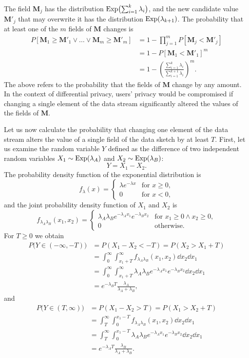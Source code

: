 The field $\mathbf{M}_j$ has the distribution $\operatorname{Exp}\bigl(\sum_{i=1}^{k} \lambda_i\bigr)$, and the new candidate value $\mathbf{M}'_j$ that may overwrite it has the distribution $\operatorname{Exp}(\lambda_{k+1})$. The probability that at least one of the $m$ fields of $\mathbf{M}$ changes is
\begin{align*}
P\left[\mathbf{M}_1 \geq \mathbf{M}'_1 \lor \ldots \lor \mathbf{M}_m \geq \mathbf{M}'_m\right]
  &= 1 - \prod_{j=1}^m P\left[\mathbf{M}_j < \mathbf{M}'_j\right] \\
  &= 1 - P\left[\mathbf{M}_1 < \mathbf{M}'_1\right]^m \\
  &= 1 - \left(\frac{\sum_{i=1}^{k} \lambda_i}{\sum_{i=1}^{k+1} \lambda_i}\right)^m.
\end{align*}
The above refers to the probability that the fields of $\mathbf{M}$ change by any amount. In the context of differential privacy, users' privacy would be compromised if changing a single element of the data stream significantly altered the values of the fields of $\mathbf{M}$.

Let us now calculate the probability that changing one element of the data stream alters the value of a single field of the data sketch by at least $T$. First, let us examine the random variable $Y$ defined as the difference of two independent random variables $X_1 \sim \operatorname{Exp}(\lambda_A)$ and $X_2 \sim \operatorname{Exp}(\lambda_B)$:
\[
Y = X_1 - X_2.
\]
The probability density function of the exponential distribution is
\[
f_\lambda(x) =
\begin{cases}
  \lambda e^{-\lambda x} & \text{for } x \geq 0, \\
  0 & \text{for } x < 0,
\end{cases}
\]
and the joint probability density function of $X_1$ and $X_2$ is
\[
f_{\lambda_A \lambda_B}(x_1, x_2) =
\begin{cases}
  \lambda_A \lambda_B e^{-\lambda_A x_1} e^{-\lambda_B x_2} & \text{for } x_1 \geq 0 \land x_2 \geq 0, \\
  0 & \text{otherwise.}
\end{cases}
\]
For $T \geq 0$ we obtain
\begin{align*}
P\bigl(Y \in (-\infty, -T)\bigr) &= P(X_1 - X_2 < -T) = P(X_2 > X_1 + T) \\
  &= \int_{0}^{\infty} \int_{x_1+T}^{\infty} f_{\lambda_A\lambda_B}(x_1, x_2) \dd x_2 \dd x_1 \\
  &= \int_{0}^{\infty} \int_{x_1+T}^{\infty} \lambda_A\lambda_B e^{-\lambda_A x_1} e^{-\lambda_B x_2} \dd x_2 \dd x_1 \\
  &= e^{-\lambda_B T} \frac{\lambda_A}{\lambda_A + \lambda_B},
\end{align*}
and
\begin{align*}
P\bigl(Y \in (T, \infty)\bigr) &= P(X_1 - X_2 > T) = P(X_1 > X_2 + T) \\
  &= \int_{T}^{\infty} \int_{0}^{x_1 - T} f_{\lambda_A\lambda_B}(x_1, x_2) \dd x_2 \dd x_1 \\
  &= \int_{T}^{\infty} \int_{0}^{x_1 - T} \lambda_A\lambda_B e^{-\lambda_A x_1} e^{-\lambda_B x_2} \dd x_2 \dd x_1 \\
  &= e^{-\lambda_A T} \frac{\lambda_B}{\lambda_A + \lambda_B}.
\end{align*}

